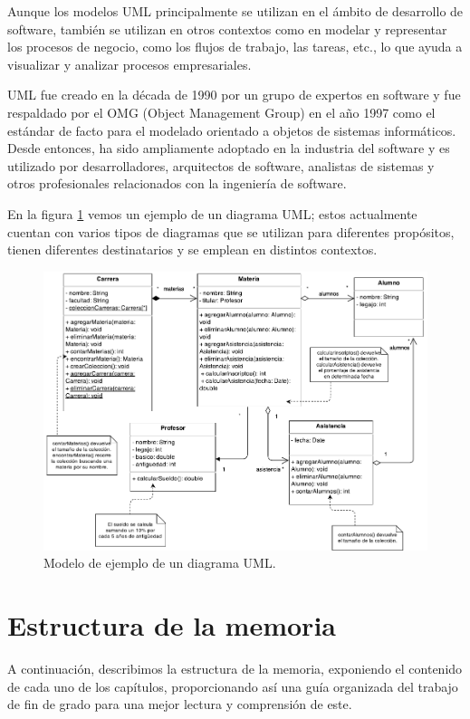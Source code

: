 \documentclass[a4paper, 12pt]{book}
\begin{document}
Aunque los modelos UML principalmente se utilizan en el ámbito de desarrollo de software, también se utilizan en otros contextos como en modelar y representar los procesos de negocio, como los flujos de trabajo, las tareas, etc., lo que ayuda a visualizar y analizar procesos empresariales.


UML fue creado en la década de 1990 por un grupo de expertos en software y fue respaldado por el OMG (Object Management Group) en el año 1997 como el estándar de facto para el modelado orientado a objetos de sistemas informáticos. 
Desde entonces, ha sido ampliamente adoptado en la industria del software y es utilizado por desarrolladores, arquitectos de software, analistas de sistemas y otros profesionales relacionados con la ingeniería de software. 


En la figura \ref{fig:diagrama-uml} vemos un ejemplo de un diagrama UML; estos actualmente cuentan con varios tipos de diagramas que se utilizan para diferentes propósitos, tienen diferentes destinatarios y se emplean en distintos contextos.


\begin{figure}
  \centering
  \includegraphics[width=16cm, keepaspectratio]{img/Diagrama-uml.png}
  \caption{Modelo de ejemplo de un diagrama UML.}\label{fig:diagrama-uml}
\end{figure}


\section{Estructura de la memoria}
\label{sec:estructura}

A continuación, describimos la estructura de la memoria, exponiendo el contenido de cada uno de los capítulos, proporcionando así una guía organizada del trabajo de fin de grado para una mejor lectura y comprensión de este.
\end{document}
